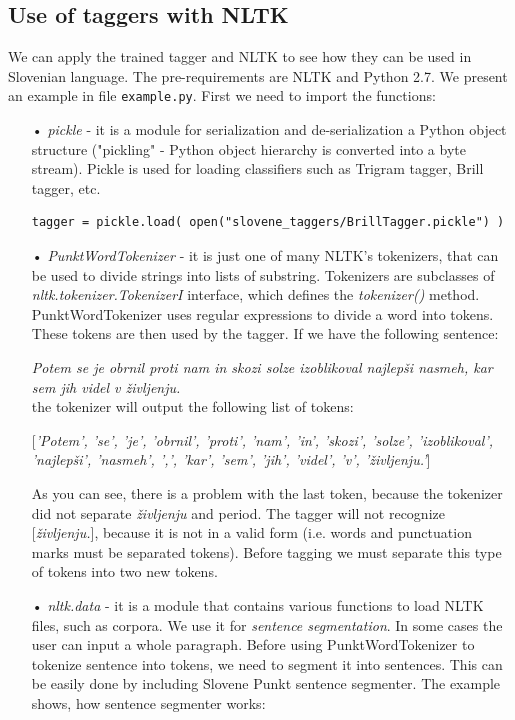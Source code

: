 \documentclass[10pt, conference, compsocconf]{IEEEtran}
\begin{document}
\subsection{Use of taggers with NLTK} %

We can apply the trained tagger and NLTK to see how they can be used in Slovenian language. The pre-requirements are NLTK and Python 2.7. We present an example in file \texttt{example.py}.
First we need to import the functions:
\begin{itemize}
\item[•] \textit{pickle} - it is a module for serialization and de-serialization a Python object structure ("pickling" - Python object hierarchy is converted into a byte stream). Pickle is used for loading classifiers such as Trigram tagger, Brill tagger, etc.
\begin{lstlisting}
tagger = pickle.load( open("slovene_taggers/BrillTagger.pickle") )
\end{lstlisting}

\item[•] \textit{PunktWordTokenizer} \cite{tokenizer} - it is just one of many NLTK's tokenizers, that can be used to divide strings into lists of substring. Tokenizers are subclasses of \textit{nltk.tokenizer.TokenizerI} interface, which defines the \textit{tokenizer()} method. PunktWordTokenizer uses regular expressions to divide a word into tokens. These tokens are then used by the tagger.  If we have the following sentence:

\textit{Potem se je obrnil proti nam in skozi solze izoblikoval najlepši nasmeh, kar sem jih videl v življenju.}\\
the tokenizer will output the following list of tokens:

[\textit{'Potem', 'se', 'je', 'obrnil', 'proti', 'nam', 'in', 'skozi', 'solze', 'izoblikoval', 'najlepši', 'nasmeh', ',', 'kar', 'sem', 'jih', 'videl', 'v', 'življenju.'}]
\par

As you can see, there is a problem with the last token, because the tokenizer did not separate \textit{življenju} and period. The tagger will not recognize [\textit{življenju.}], because it is not in a valid form (i.e. words and punctuation marks must be separated tokens). Before tagging we must separate this type of tokens into two new tokens.

\item[•] \textit{nltk.data} - it is a module that contains various functions to load NLTK files, such as corpora. We use it for \textit{sentence segmentation}. In some cases the user can input a whole paragraph. Before using PunktWordTokenizer to tokenize sentence into tokens, we need to segment it into sentences. This can be easily done by including Slovene Punkt sentence segmenter. The example shows, how sentence segmenter works:


\end{itemize}
\end{document}
